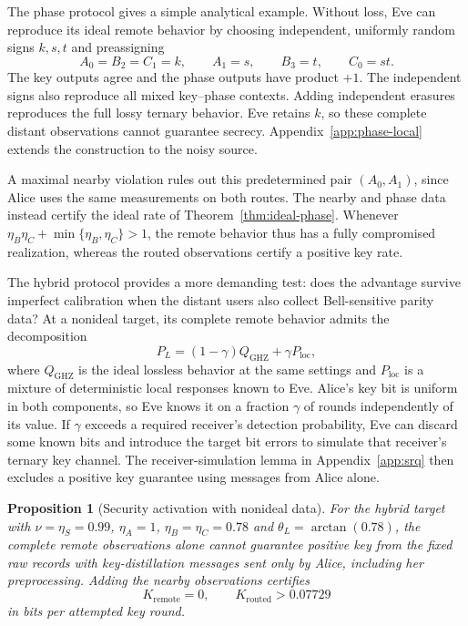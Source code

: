 \documentclass[aps,10pt,onecolumn,prx,superscriptaddress,longbibliography,nofootinbib]{revtex4-2}
\newtheorem{proposition}[theorem]{Proposition}
\begin{document}
The phase protocol gives a simple analytical example. Without loss, Eve can reproduce its ideal remote behavior by choosing independent, uniformly random signs \(k,s,t\) and preassigning
\begin{equation}
 A_0=B_2=C_1=k,\qquad A_1=s,\qquad B_3=t,\qquad C_0=st.
 \label{eq:phase-local-example}
\end{equation}
The key outputs agree and the phase outputs have product \(+1\). The independent signs also reproduce all mixed key--phase contexts. Adding independent erasures reproduces the full lossy ternary behavior. Eve retains \(k\), so these complete distant observations cannot guarantee secrecy. Appendix~\ref{app:phase-local} extends the construction to the noisy source.

A maximal nearby violation rules out this predetermined pair \((A_0,A_1)\), since Alice uses the same measurements on both routes. The nearby and phase data instead certify the ideal rate of Theorem~\ref{thm:ideal-phase}. Whenever \(\eta_B\eta_C+\min\{\eta_B,\eta_C\}>1\), the remote behavior thus has a fully compromised realization, whereas the routed observations certify a positive key rate.

The hybrid protocol provides a more demanding test: does the advantage survive imperfect calibration when the distant users also collect Bell-sensitive parity data? At a nonideal target, its complete remote behavior admits the decomposition
\begin{equation}
 P_L=(1-\gamma)Q_{\mathrm{GHZ}}+\gamma P_{\mathrm{loc}},
 \label{eq:remote-decomposition}
\end{equation}
where \(Q_{\mathrm{GHZ}}\) is the ideal lossless behavior at the same settings and \(P_{\mathrm{loc}}\) is a mixture of deterministic local responses known to Eve. Alice's key bit is uniform in both components, so Eve knows it on a fraction \(\gamma\) of rounds independently of its value. If \(\gamma\) exceeds a required receiver's detection probability, Eve can discard some known bits and introduce the target bit errors to simulate that receiver's ternary key channel. The receiver-simulation lemma in Appendix~\ref{app:srq} then excludes a positive key guarantee using messages from Alice alone.

\begin{proposition}[Security activation with nonideal data]\label{thm:noisy-activation}
For the hybrid target with \(\nu=\eta_S=0.99\), \(\eta_A=1\), \(\eta_B=\eta_C=0.78\) and \(\theta_L=\arctan(0.78)\), the complete remote observations alone cannot guarantee positive key from the fixed raw records with key-distillation messages sent only by Alice, including her preprocessing. Adding the nearby observations certifies
\begin{equation}
 K_{\mathrm{remote}}=0,\qquad
 K_{\mathrm{routed}}>0.07729
 \label{eq:strict-separation}
\end{equation}
in bits per attempted key round.
\end{proposition}
\end{document}
